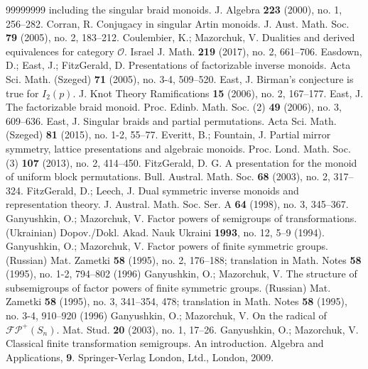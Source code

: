 \documentclass[a4paper]{amsart}
\begin{document}
\begin{thebibliography}{99999999}
including the singular braid monoids. J. Algebra {\bf 223} 
(2000), no. 1, 256--282.
 Corran, R. Conjugacy in singular Artin monoids. 
J. Aust. Math. Soc. {\bf 79} (2005), no. 2, 183--212.
 Coulembier, K.; Mazorchuk, V. Dualities and derived 
equivalences for category $\mathcal{O}$. Israel J. Math. {\bf 219} (2017), no. 2, 661--706.
 Easdown, D.; East, J.; FitzGerald, D. 
Presentations of factorizable inverse monoids. Acta Sci. Math. (Szeged) 
{\bf 71} (2005), no. 3-4, 509--520.
  East, J. Birman's conjecture is true for $I_2(p)$.
J. Knot Theory Ramifications {\bf 15} (2006), no. 2, 167--177. 
  East, J. The factorizable braid monoid. 
Proc. Edinb. Math. Soc. (2) {\bf 49} (2006), no. 3, 609--636.
  East, J. Singular braids and partial permutations. 
Acta Sci. Math. (Szeged) {\bf 81} (2015), no. 1-2, 55--77.
  Everitt, B.; Fountain, J.
Partial mirror symmetry, lattice presentations and algebraic monoids. 
Proc. Lond. Math. Soc. (3) {\bf 107} (2013), no. 2, 414--450. 
 FitzGerald, D. G. A presentation for the monoid of 
uniform block permutations. Bull. Austral. Math. Soc. {\bf 68} (2003), no. 2, 317--324. 
 FitzGerald, D.; Leech, J. Dual symmetric inverse 
monoids and representation theory. J. Austral. Math. Soc. Ser. 
A {\bf 64} (1998), no. 3, 345--367.
 Ganyushkin, O.; Mazorchuk, V. Factor powers of semigroups of 
transformations. (Ukrainian) Dopov./Dokl. Akad. Nauk Ukraini {\bf 1993}, no. 12, 5--9 (1994).
 Ganyushkin, O.; Mazorchuk, V. Factor powers of finite symmetric groups. 
(Russian) Mat. Zametki {\bf 58} (1995), no. 2, 176--188; translation in Math. Notes 
{\bf 58} (1995), no. 1-2, 794--802 (1996) 
 Ganyushkin, O.; Mazorchuk, V. The structure of subsemigroups of 
factor powers of finite symmetric groups. (Russian) Mat. Zametki {\bf 58} 
(1995), no. 3, 341--354, 478; translation in Math. Notes {\bf 58} (1995), no. 3-4, 910--920 (1996)
 Ganyushkin, O.; Mazorchuk, V. On the radical of $\mathcal{FP}^+(S_n)$. 
Mat. Stud. {\bf 20} (2003), no. 1, 17--26.
 Ganyushkin, O.; Mazorchuk, V. Classical finite transformation semigroups. 
An introduction. Algebra and Applications, {\bf 9}. Springer-Verlag London, Ltd., London, 2009. 

\end{thebibliography}
\end{document}
